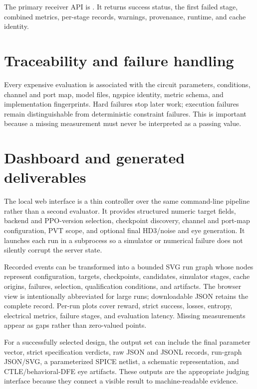 The primary receiver API is .
It returns success status, the first failed stage, combined metrics, per-stage
records, warnings, provenance, runtime, and cache identity.

\section{Traceability and failure handling}

Every expensive evaluation is associated with the circuit parameters,
conditions, channel and port map, model files, ngspice identity, metric schema,
and implementation fingerprints. Hard failures stop later work; execution
failures remain distinguishable from deterministic constraint failures. This is
important because a missing measurement must never be interpreted as a passing
value.

\section{Dashboard and generated deliverables}

The local web interface is a thin controller over the same command-line pipeline
rather than a second evaluator. It provides structured numeric target fields,
backend and PPO-version selection, checkpoint discovery, channel and port-map
configuration, PVT scope, and optional final HD3/noise and eye generation. It
launches each run in a subprocess so a simulator or numerical failure does not
silently corrupt the server state.

Recorded events can be transformed into a bounded SVG run graph whose nodes
represent configuration, targets, checkpoints, candidates, simulator stages,
cache origins, failures, selection, qualification conditions, and artifacts.
The browser view is intentionally abbreviated for large runs; downloadable JSON
retains the complete record. Per-run plots cover reward, strict success, losses,
entropy, electrical metrics, failure stages, and evaluation latency. Missing
measurements appear as gaps rather than zero-valued points.

For a successfully selected design, the output set can include the final
parameter vector, strict specification verdicts, raw JSON and JSONL records,
run-graph JSON/SVG, a parameterized SPICE netlist, a schematic representation,
and CTLE/behavioral-DFE eye artifacts. These outputs are the appropriate judging
interface because they connect a visible result to machine-readable evidence.

